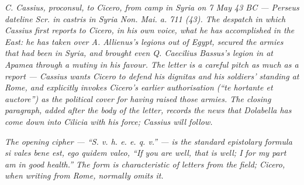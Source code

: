 
\textit{C. Cassius, proconsul, to Cicero, from camp in Syria on 7 May 43 BC
--- Perseus dateline \textit{Scr. in castris in Syria Non. Mai. a. 711
(43)}. The despatch in which Cassius first reports to Cicero, in his
own voice, what he has accomplished in the East: he has taken over
A. Allienus's legions out of Egypt, secured the armies that had been in
Syria, and brought even Q. Caecilius Bassus's legion in at Apamea
through a mutiny in his favour. The letter is a careful pitch as much
as a report --- Cassius wants Cicero to defend his \emph{dignitas} and his
soldiers' standing at Rome, and explicitly invokes Cicero's earlier
authorisation (``te hortante et auctore'') as the political cover for
having raised those armies. The closing paragraph, added after the body
of the letter, records the news that Dolabella has come down into
Cilicia with his force; Cassius will follow.}

\textit{The opening cipher --- ``S. v. h. e. e. q. v.'' --- is the standard
epistolary formula \emph{si vales bene est, ego quidem valeo}, ``If you
are well, that is well; I for my part am in good health.'' The form is
characteristic of letters from the field; Cicero, when writing from
Rome, normally omits it.}
